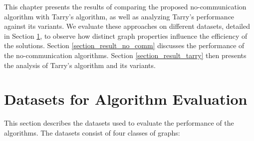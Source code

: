 This chapter presents the results of comparing the proposed no-communication algorithm with Tarry's algorithm, as well as analyzing Tarry's performance against its variants. We evaluate these approaches on different datasets, detailed in Section \ref{section_datasets}, to observe how distinct graph properties influence the efficiency of the solutions. Section \ref{section_result_no_comm} discusses the performance of the no-communication algorithms. Section \ref{section_result_tarry} then presents the analysis of Tarry's algorithm and its variants.

\section{Datasets for Algorithm Evaluation} 
\label{section_datasets}

This section describes the datasets used to evaluate the performance of the algorithms. The datasets consist of four classes of graphs:

